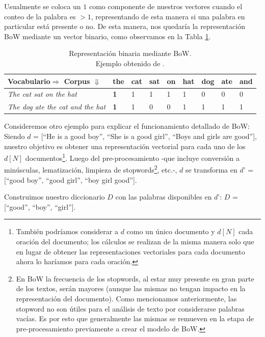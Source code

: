 \documentclass[12pt,a4paper]{article}
\begin{document}
\begin{sloppypar}
Usualmente se coloca un $1$ como componente de nuestros vectores cuando el conteo de la palabra es $>1$, representando de esta manera si una palabra en particular está presente o no. De esta manera, nos quedaría la representación BoW mediante un vector binario, como observamos en la Tabla \ref{table:bow_2}.

\begin{table}[h!]
\centering
\begin{tabular}{|p{4cm}||p{1cm}|p{1cm}|p{1cm}|p{1cm}|p{1cm}|p{1cm}|p{1cm}|p{1cm}|}
\hline
\textbf{Vocabulario$\Rightarrow$ Corpus $\Downarrow$} & the & cat & sat & on & hat & dog & ate & and \\ [1ex] 
\hline
\textit{The cat sat on the hat} & \textbf{1} & 1 & 1 & 1 & 1 & 0 & 0 & 0 \\ 
\hline
\textit{The dog ate the cat and the hat} & \textbf{1} & 1 & 0 & 0 & 1 & 1 & 1 & 1 \\ 
\hline
\end{tabular}
\caption{Representación binaria mediante BoW.\\ Ejemplo obtenido de \cite{NLP_8}.} 
\label{table:bow_2}
\end{table}

Consideremos otro ejemplo para explicar el funcionamiento detallado de BoW\cite{NLP_2}: 
Siendo $d$ = [``He is a good boy'', ``She is a good girl'', ``Boys and girls are good''], nuestro objetivo es obtener una representación vectorial para cada uno de los $d[N]$ documentos\footnote{También podríamos considerar a $d$ como un único documento y $d[N]$ cada oración del documento; los cálculos se realizan de la misma manera solo que en lugar de obtener las representaciones vectoriales para cada documento ahora lo haríamos para cada oración.}.
Luego del pre-procesamiento -que incluye conversión a minúsculas, lematización, limpieza de stopwords\footnote{En BoW la frecuencia de los stopwords, al estar muy presente en gran parte de los textos, serán mayores (aunque las mismas no tengan impacto en la representación del documento). Como mencionamos anteriormente, las stopword no son útiles para el análisis de texto por considerarse palabras vacías. Es por esto que generalmente las mismas se remueven en la etapa de pre-procesamiento previamente a crear el modelo de BoW.}, etc.-, $d$ se transforma en $d’$ = [``good boy'', ``good girl'', ``boy girl good'']. 

Construimos nuestro diccionario $D$ con las palabras disponibles en $d’$: \hspace{3cm}
$D$ = [``good'', ``boy'', ``girl''].


\end{sloppypar}
\end{document}
